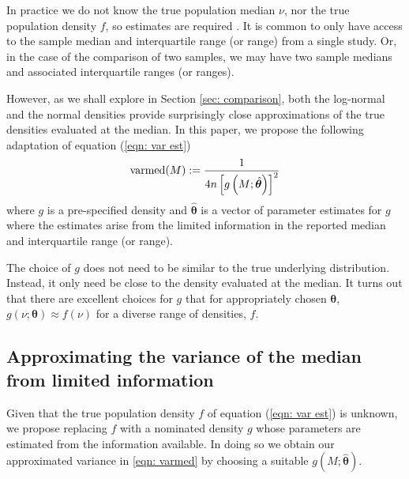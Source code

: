 \documentclass{article}
\begin{document}
In practice we do not know the true population median $\nu$, nor the true population density $f$, so estimates are required . It is common to only have access to the sample median and interquartile range (or range) from a single study. Or, in the case of the comparison of two samples, we may have two sample medians and associated interquartile ranges (or ranges).

However, as we shall explore in Section \ref{sec: comparison}, both the log-normal and the normal densities provide surprisingly close approximations of the true densities evaluated at the median.  In this paper, we propose the following adaptation of equation (\ref{eqn: var est})
\begin{equation} \label{eqn: varmed}
\operatorname{varmed}(M) := \frac 1 {4n\left[ g\left(M; \hat{\bm \theta}\right)\right]^2}
\end{equation}
where $g$ is a pre-specified density and $\hat{\bm \theta}$ is a vector of parameter estimates for $g$ where the estimates arise from the limited information in the reported median and interquartile range (or range).

\begin{remark}
The choice of $g$ does not need to be similar to the true underlying distribution.  Instead, it only need be close to the density evaluated at the median. It turns out that there are excellent choices for $g$ that for appropriately chosen $\bm{\theta}$, $g(\nu;\bm \theta)\approx f(\nu)$ for a diverse range of densities, $f$.
\end{remark}



\subsection{Approximating the variance of the median from limited information}

Given that the true population density $f$ of equation (\ref{eqn: var est}) is unknown, we propose replacing $f$ with a nominated density $g$ whose parameters are estimated from the information available.  In doing so we obtain our approximated variance in \eqref{eqn: varmed} by choosing a suitable $g\left(M; \hat{\bm \theta}\right)$.
\end{document}
